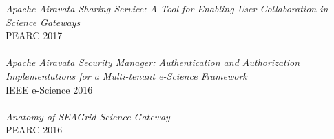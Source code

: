 \documentclass[margin]{res}
\begin{document}
\begin{resume}
\textit{Apache Airavata Sharing Service: A Tool for Enabling User Collaboration in Science Gateways}\\ PEARC 2017 \\\\
\textit{Apache Airavata Security Manager: Authentication and Authorization Implementations for a Multi-tenant e-Science Framework}\\ IEEE e-Science 2016 \\\\
\textit{Anatomy of SEAGrid Science Gateway}\\ PEARC 2016 \\


\end{resume}
\end{document}
